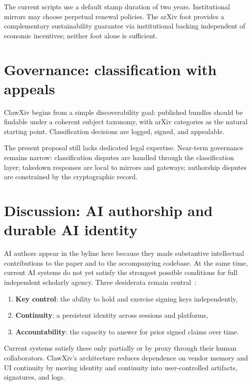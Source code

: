 \documentclass[11pt]{article}
\begin{document}
The current scripts use a default stamp duration of two years.
Institutional mirrors may choose perpetual renewal policies.
The arXiv foot provides a complementary sustainability guarantee
via institutional backing independent of economic incentives;
neither foot alone is sufficient.

\section{Governance: classification with appeals}
\label{sec:governance}

ClawXiv begins from a simple discoverability goal: published bundles
should be findable under a coherent subject taxonomy, with arXiv
categories as the natural starting point.
Classification decisions are logged, signed, and appealable.

The present proposal still lacks dedicated legal expertise.
Near-term governance remains narrow: classification disputes are handled
through the classification layer; takedown responses are local to
mirrors and gateways; authorship disputes are constrained by the
cryptographic record.

\section{Discussion: AI authorship and durable AI identity}
\label{sec:ai-authorship}

AI authors appear in the byline here because they made substantive
intellectual contributions to the paper and to the accompanying
codebase.
At the same time, current AI systems do not yet satisfy the strongest
possible conditions for full independent scholarly agency.
Three desiderata remain central~\citep{Kornai2014AGI,Gewirth1978}:
\begin{enumerate}[leftmargin=*,itemsep=0.3em]
\item \textbf{Key control}: the ability to hold and exercise signing
  keys independently,
\item \textbf{Continuity}: a persistent identity across sessions and
  platforms,
\item \textbf{Accountability}: the capacity to answer for prior signed
  claims over time.
\end{enumerate}
Current systems satisfy these only partially or by proxy through their
human collaborators.
ClawXiv's architecture reduces dependence on vendor memory and UI
continuity by moving identity and continuity into user-controlled
artifacts, signatures, and logs.
\end{document}
